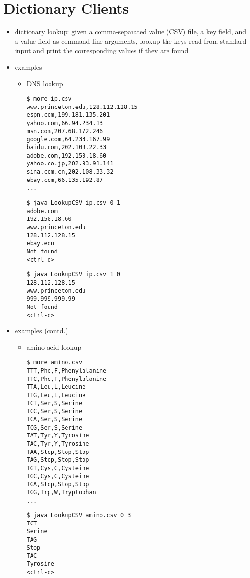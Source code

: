 \documentclass[8pt,a4paper,compress]{beamer}
\begin{document}
\section{Dictionary Clients}
\begin{frame}[fragile]
\begin{itemize}
\item dictionary lookup: given a comma-separated value (CSV) file, a key field, and a value field as command-line arguments, lookup the keys read from standard input and print the corresponding values if they are found

\item examples
\begin{itemize}
\item DNS lookup
\begin{lstlisting}[language={}]
$ more ip.csv
www.princeton.edu,128.112.128.15
espn.com,199.181.135.201
yahoo.com,66.94.234.13
msn.com,207.68.172.246
google.com,64.233.167.99
baidu.com,202.108.22.33
adobe.com,192.150.18.60
yahoo.co.jp,202.93.91.141
sina.com.cn,202.108.33.32
ebay.com,66.135.192.87
...
\end{lstlisting}
\begin{lstlisting}[language={}]
$ java LookupCSV ip.csv 0 1
adobe.com
192.150.18.60
www.princeton.edu
128.112.128.15
ebay.edu
Not found 
<ctrl-d>
\end{lstlisting}
\begin{lstlisting}[language={}]
$ java LookupCSV ip.csv 1 0
128.112.128.15
www.princeton.edu
999.999.999.99
Not found
<ctrl-d>
\end{lstlisting}
\end{itemize}
\end{itemize}
\end{frame}

\begin{frame}[fragile]
\begin{itemize}
\item examples (contd.)
\begin{itemize}
\item amino acid lookup
\begin{lstlisting}[language={}]
$ more amino.csv
TTT,Phe,F,Phenylalanine
TTC,Phe,F,Phenylalanine
TTA,Leu,L,Leucine
TTG,Leu,L,Leucine
TCT,Ser,S,Serine
TCC,Ser,S,Serine
TCA,Ser,S,Serine
TCG,Ser,S,Serine
TAT,Tyr,Y,Tyrosine
TAC,Tyr,Y,Tyrosine
TAA,Stop,Stop,Stop
TAG,Stop,Stop,Stop
TGT,Cys,C,Cysteine
TGC,Cys,C,Cysteine
TGA,Stop,Stop,Stop
TGG,Trp,W,Tryptophan
...
\end{lstlisting}
\begin{lstlisting}[language={}]
$ java LookupCSV amino.csv 0 3
TCT
Serine
TAG
Stop
TAC
Tyrosine
<ctrl-d>
\end{lstlisting}
\end{itemize}
\end{itemize}
\end{frame}
\end{document}
